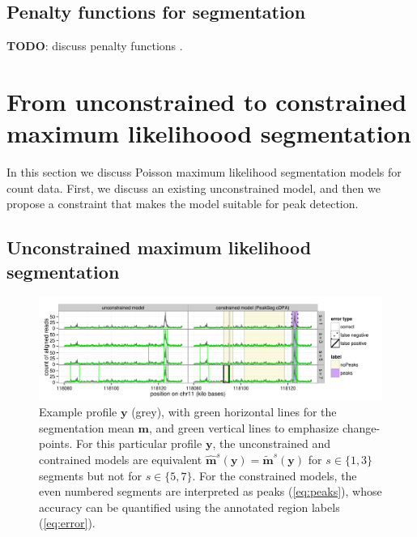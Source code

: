 \documentclass{article}
\begin{document}
\subsection{Penalty functions for segmentation}

\textbf{TODO}: discuss penalty functions \citep{cleynen2013segmentation}.

\section{From unconstrained to constrained maximum likelihoood
  segmentation}
\label{sec:model}

In this section we discuss Poisson maximum likelihood segmentation
models for count data. First, we discuss an existing unconstrained
model, and then we propose a constraint that makes the model suitable
for peak detection.

\subsection{Unconstrained maximum likelihood segmentation}

\begin{figure}[b!]
  \centering
  \includegraphics[width=\textwidth]{figure-Segmentor-PeakSeg}
  \vskip -0.5cm
  \caption{Example profile $\mathbf y$ (grey), with green horizontal
    lines for the segmentation mean $\mathbf m$, and green vertical
    lines to emphasize change-points. For this particular profile
    $\mathbf y$, the unconstrained and contrained models are
    equivalent $\mathbf{\hat m}^s(\mathbf y) = \mathbf{\tilde
      m}^s(\mathbf y)$ for $s\in\{1, 3\}$ segments but not for
    $s\in\{5, 7\}$. For the constrained models, the even numbered
    segments are interpreted as peaks (\ref{eq:peaks}), whose accuracy
    can be quantified using the annotated region labels (\ref{eq:error}).}
  \label{fig:profiles}
\end{figure}
\end{document}
